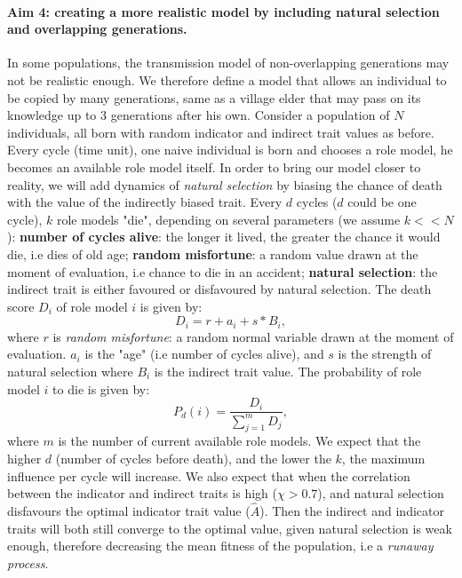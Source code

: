 \documentclass[11pt]{article}
\begin{document}
 \paragraph*{Aim 4: creating a more realistic model by including natural selection and overlapping generations.}\label{cyclic model}
 In some populations, the transmission model of non-overlapping generations may not be realistic enough.
 We therefore define a model that allows an individual to be copied by many generations, same as a village elder that may pass on its knowledge up to 3 generations after his own.  
 Consider a population of $N$ individuals, all born with random indicator and indirect trait values as before. %
 Every cycle (time unit), one naive individual is born and chooses a role model, he becomes an available role model itself. %
 In order to bring our model closer to reality, we will add dynamics of \textit{natural selection} by biasing the chance of death with the value of the indirectly biased trait.
 Every $d$ cycles ($d$ could be one cycle), $k$ role models "die", depending on several parameters (we assume $k << N$): %
  \textbf{number of cycles alive}: the longer it lived, the greater the chance it would die, i.e dies of old age; %
  \textbf{random misfortune}: a random value drawn at the moment of evaluation, i.e chance to die in an accident; %
   \textbf{natural selection}: the indirect trait is either favoured or disfavoured by natural selection. %
 The death score $D_i$ of role model $i$ is given by:
  \begin{equation}
  D_i = r + a_i + s*B_i,
  \end{equation}
  where $r$ is \textit{random misfortune}: a random normal variable drawn at the moment of evaluation. $a_i$ is the "age" (i.e number of cycles alive), and $s$ is the strength of natural selection where $B_i$ is the indirect trait value. %
  The probability of role model $i$ to die is given by:
  \begin{equation}
  P_d(i) = \frac {D_i}{\sum\limits_{j=1}^{m} D_j},
  \end{equation}  
   where $m$ is the number of current available role models. 
  We expect that the higher $d$ (number of cycles before death), and the lower the $k$, the maximum influence per cycle will increase.
  We also expect that when the correlation between the indicator and indirect traits is high ($\chi > 0.7$), and natural selection disfavours the optimal indicator trait value ($\hat{A}$). 
  Then the indirect and indicator traits will both still converge to the optimal value, given natural selection is weak enough, therefore decreasing the mean fitness of the population, i.e a \textit{runaway process}.
\end{document}
